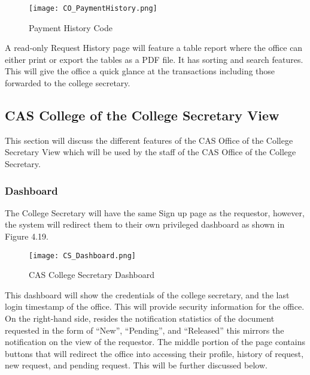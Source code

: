 \begin{figure}[h]
    \centering 
    \begin{minipage}[c]{0.5\linewidth}
        \centering
        \texttt{[image: CO\_PaymentHistory.png]}
        \caption{Payment History Code}
        \label{fig:CO_PaymentHistory}
    \end{minipage}
\end{figure}

A read-only  Request History page will feature a table report where the office can either print or export the tables as a PDF file. It has sorting and search features. This will give the office a quick glance at the transactions including those forwarded to the college secretary.


\subsection{CAS College of the College Secretary View}

This section will discuss the different features of the CAS Office of the College Secretary View which will be used by the staff of the CAS Office of the College Secretary.



\subsubsection{Dashboard}
The College Secretary will have the same Sign up page as the requestor, however, the system will redirect them to their own privileged dashboard as shown in Figure 4.19. 

    \begin{figure}[h]
        \centering 
        \begin{minipage}[c]{0.5\linewidth}
            \centering
            \texttt{[image: CS\_Dashboard.png]}
            \caption{CAS College Secretary Dashboard}
            \label{fig:CS_Dashboard}
        \end{minipage}
    \end{figure}

This dashboard will show the credentials of the college secretary, and the last login timestamp of the office. This will provide security information for the office. On the right-hand side, resides the notification statistics of the document requested in the form of “New”, “Pending”, and “Released” this mirrors the notification on the view of the requestor. The middle portion of the page contains buttons that will redirect the office into accessing their profile, history of request, new request, and pending request. This will be further discussed below.

